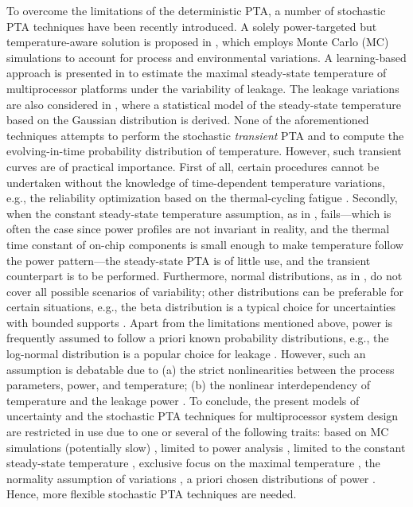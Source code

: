 To overcome the limitations of the deterministic PTA, a number of stochastic PTA techniques have been recently introduced. A solely power-targeted but temperature-aware solution is proposed in \cite{chandra2010}, which employs Monte Carlo (MC) simulations to account for process and environmental variations. A learning-based approach is presented in \cite{juan2011} to estimate the maximal steady-state temperature of multiprocessor platforms under the variability of leakage. The leakage variations are also considered in \cite{juan2012}, where a statistical model of the steady-state temperature based on the Gaussian distribution is derived. None of the aforementioned techniques attempts to perform the stochastic \emph{transient} PTA and to compute the evolving-in-time probability distribution of temperature. However, such transient curves are of practical importance. First of all, certain procedures cannot be undertaken without the knowledge of time-dependent temperature variations, e.g., the reliability optimization based on the thermal-cycling fatigue \cite{ukhov2012}. Secondly, when the constant steady-state temperature assumption, as in \cite{juan2011, juan2012}, fails---which is often the case since power profiles are not invariant in reality, and the thermal time constant of on-chip components is small enough to make temperature follow the power pattern---the steady-state PTA is of little use, and the transient counterpart is to be performed. Furthermore, normal distributions, as in \cite{juan2012}, do not cover all possible scenarios of variability; other distributions can be preferable for certain situations, e.g., the beta distribution is a typical choice for uncertainties with bounded supports \cite{maitre2010}. Apart from the limitations mentioned above, power is frequently assumed to follow a priori known probability distributions, e.g., the log-normal distribution is a popular choice for leakage \cite{srivastava2010}. However, such an assumption is debatable due to (a) the strict nonlinearities between the process parameters, power, and temperature; (b) the nonlinear interdependency of temperature and the leakage power \cite{liu2007}. To conclude, the present models of uncertainty and the stochastic PTA techniques for multiprocessor system design are restricted in use due to one or several of the following traits: based on MC simulations (potentially slow) \cite{chandra2010}, limited to power analysis \cite{chandra2010}, limited to the constant steady-state temperature \cite{juan2011, juan2012}, exclusive focus on the maximal temperature \cite{juan2011}, the normality assumption of variations \cite{juan2012}, a priori chosen distributions of power \cite{srivastava2010}. Hence, more flexible stochastic PTA techniques are needed.

